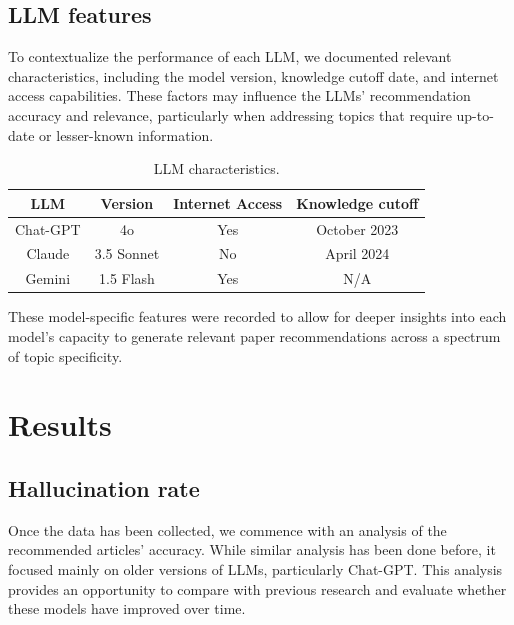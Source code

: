\documentclass[runningheads]{llncs}
\begin{document}
\subsection{LLM features}

To contextualize the performance of each LLM, we documented relevant characteristics, including the model version, knowledge cutoff date, and internet access capabilities. These factors may influence the LLMs' recommendation accuracy and relevance, particularly when addressing topics that require up-to-date or lesser-known information.

\begin{table}[!ht]
    \centering
    \begin{tabular}{c c c c}
        \hline
        \textbf{LLM} & \textbf{Version} & \textbf{Internet Access} & \textbf{Knowledge cutoff} \\
        \hline
        Chat-GPT & 4o & Yes & October  2023\footnotemark[1] \\
        Claude & 3.5 Sonnet & No & April 2024\footnotemark[2] \\
        Gemini & 1.5 Flash & Yes & N/A\\
        \hline
    \end{tabular}
    \caption{LLM characteristics.}
\end{table}



These model-specific features were recorded to allow for deeper insights into each model's capacity to generate relevant paper recommendations across a spectrum of topic specificity.

\section{Results}\label{results}

\subsection{Hallucination rate}

Once the data has been collected, we commence with an analysis of the recommended articles' accuracy. While similar analysis has been done before, it focused mainly on older versions of LLMs, particularly Chat-GPT. This analysis provides an opportunity to compare with previous research and evaluate whether these models have improved over time.
\end{document}
